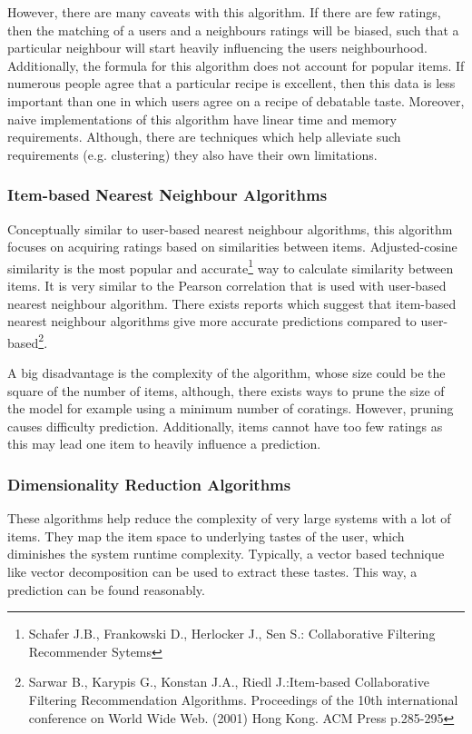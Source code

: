 However, there are many caveats with this algorithm. If there are few ratings, then the matching of a users and a neighbours ratings will be biased, such that a particular neighbour will start heavily influencing the users neighbourhood. Additionally, the formula for this algorithm does not account for popular items. If numerous people agree that a particular recipe is excellent, then this data is less important than one in which users agree on a recipe of debatable taste. Moreover, naive implementations of this algorithm have linear time and memory requirements. Although, there are techniques which help alleviate such requirements (e.g. clustering) they also have their own limitations.

\subsubsection{Item-based Nearest Neighbour Algorithms}

 Conceptually similar to user-based nearest neighbour algorithms, this algorithm focuses on acquiring ratings based on similarities between items. Adjusted-cosine similarity is the most popular and accurate\footnote{Schafer J.B., Frankowski D., Herlocker J., Sen S.: Collaborative Filtering Recommender Sytems} way to calculate similarity between items. It is very similar to the Pearson correlation that is used with user-based nearest neighbour algorithm. There exists reports which suggest that item-based nearest neighbour algorithms give more accurate predictions compared to user-based\footnote{Sarwar B., Karypis G., Konstan J.A., Riedl J.:Item-based Collaborative Filtering Recommendation Algorithms. Proceedings of the 10th international conference on World Wide Web. (2001) Hong Kong. ACM Press p.285-295}.

A big disadvantage is the complexity of the algorithm, whose size could be the square of the number of items, although, there exists ways to prune the size of the model for example using a minimum number of coratings. However, pruning causes difficulty prediction. Additionally, items cannot have too few ratings as this may lead one item to heavily influence a prediction.

\subsubsection{Dimensionality Reduction Algorithms}

These algorithms help reduce the complexity of very large systems with a lot of items. They map the item space to underlying tastes of the user, which diminishes the system runtime complexity. Typically, a vector based technique like vector decomposition can be used to extract these tastes. This way, a prediction can be found reasonably.

